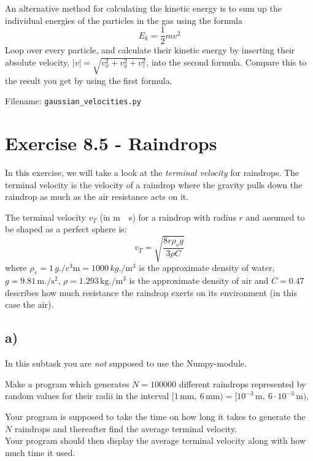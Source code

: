 \documentclass[10pt,a4paper]{article}
\begin{document}
An alternative method for calculating the kinetic energy is  to sum up the individual energies of the particles in the gas using the formula
\[	E_k = \frac{1}{2}mv^2
\]
Loop over every particle, and calculate their kinetic energy by inserting their absolute velocity, $|v| = \sqrt{v_x^2 + v_y^2 + v_z^2}$, into the second formula. Compare this to the result you get by using the first formula.

Filename: \texttt{gaussian\_velocities.py}



\section*{Exercise 8.5 - Raindrops}

In this exercise, we will take a look at the \textit{terminal velocity} for raindrops. The terminal velocity is the velocity of a raindrop where the gravity pulls down the raindrop as much as the air resistance acts on it. 

The terminal velocity  $v_T$ (in \si{\meter.\per\second}) for a raindrop with radius $r$ and assumed to be shaped as a perfect sphere is:
\[
v_T = \sqrt{\frac{8r\rho_v g}{3\rho C}}
\]
where $\rho_v = 1\,\si{g.\per\cubic\centi\meter} = 1000 \,\si{kg.\per\cubic\meter}$ is the approximate density of water, $g = 9.81 \,\si{\meter.\per\square\second}$, $\rho = 1.293 \,\si{\kg.\per\cubic\meter}$ is the approximate density of air and $C = 0.47$ describes how much resistance the raindrop exerts on its environment (in this case the air). 

\subsection*{a)}
In this subtask you are \textit{not} supposed to use the Numpy-module. 

Make a program which generates $N = 100000$ different raindrops represented by random values for their radii in the interval $[1\,\si{\milli\meter},\ 6\,\si{\milli\meter}) = [10^{-3}\,\si{\meter},\ 6\cdot 10^{-3}\,\si{\meter}) $. 

Your program is supposed to take the time on how long it takes to generate the $N$ raindrops and thereafter find the average terminal velocity. \\
Your program should then display the average terminal velocity along with how much time it used. 
\end{document}
